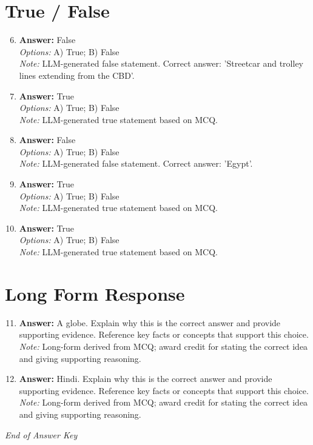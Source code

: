 \documentclass[12pt]{article}
\begin{document}
\section*{True / False}
\begin{enumerate}[label=\arabic*.]
\setcounter{enumi}{5}
\item \textbf{Answer:} False
\\ \textit{Options:} A) True; B) False
\\ \textit{Note:} LLM-generated false statement. Correct answer: 'Streetcar and trolley lines extending from the CBD'.
\item \textbf{Answer:} True
\\ \textit{Options:} A) True; B) False
\\ \textit{Note:} LLM-generated true statement based on MCQ.
\item \textbf{Answer:} False
\\ \textit{Options:} A) True; B) False
\\ \textit{Note:} LLM-generated false statement. Correct answer: 'Egypt'.
\item \textbf{Answer:} True
\\ \textit{Options:} A) True; B) False
\\ \textit{Note:} LLM-generated true statement based on MCQ.
\item \textbf{Answer:} True
\\ \textit{Options:} A) True; B) False
\\ \textit{Note:} LLM-generated true statement based on MCQ.
\end{enumerate}

\section*{Long Form Response}
\begin{enumerate}[label=\arabic*.]
\setcounter{enumi}{10}
\item \textbf{Answer:} A globe. Explain why this is the correct answer and provide supporting evidence. Reference key facts or concepts that support this choice.
\\ \textit{Note:} Long-form derived from MCQ; award credit for stating the correct idea and giving supporting reasoning.
\item \textbf{Answer:} Hindi. Explain why this is the correct answer and provide supporting evidence. Reference key facts or concepts that support this choice.
\\ \textit{Note:} Long-form derived from MCQ; award credit for stating the correct idea and giving supporting reasoning.
\end{enumerate}

\vfill
\noindent\textit{End of Answer Key}
\end{document}
